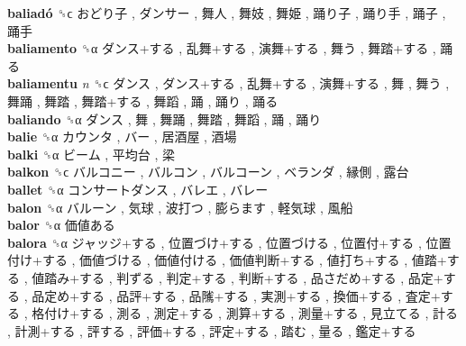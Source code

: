 \textbf{baliadó} ␝ϲ   おどり子 ,  ダンサー ,  舞人 ,  舞妓 ,  舞姫 ,  踊り子 ,  踊り手 ,  踊子 ,  踊手   \\
\textbf{baliamento} ␝α   ダンス+する ,  乱舞+する ,  演舞+する ,  舞う ,  舞踏+する ,  踊る   \\
\textbf{baliamentu} \emph{n}  ␝ϲ   ダンス ,  ダンス+する ,  乱舞+する ,  演舞+する ,  舞 ,  舞う ,  舞踊 ,  舞踏 ,  舞踏+する ,  舞蹈 ,  踊 ,  踊り ,  踊る   \\
\textbf{baliando} ␝α   ダンス ,  舞 ,  舞踊 ,  舞踏 ,  舞蹈 ,  踊 ,  踊り   \\
\textbf{balie} ␝α   カウンタ ,  バー ,  居酒屋 ,  酒場   \\
\textbf{balki} ␝α   ビーム ,  平均台 ,  梁   \\
\textbf{balkon} ␝ϲ   バルコニー ,  バルコン ,  バルコーン ,  ベランダ ,  縁側 ,  露台   \\
\textbf{ballet} ␝α   コンサートダンス ,  バレエ ,  バレー   \\
\textbf{balon} ␝α   バルーン ,  気球 ,  波打つ ,  膨らます ,  軽気球 ,  風船   \\
\textbf{balor} ␝α   価値ある   \\
\textbf{balora} ␝α   ジャッジ+する ,  位置づけ+する ,  位置づける ,  位置付+する ,  位置付け+する ,  価値づける ,  価値付ける ,  価値判断+する ,  値打ち+する ,  値踏+する ,  値踏み+する ,  判ずる ,  判定+する ,  判断+する ,  品さだめ+する ,  品定+する ,  品定め+する ,  品評+する ,  品隲+する ,  実測+する ,  換価+する ,  査定+する ,  格付け+する ,  測る ,  測定+する ,  測算+する ,  測量+する ,  見立てる ,  計る ,  計測+する ,  評する ,  評価+する ,  評定+する ,  踏む ,  量る ,  鑑定+する   \\
